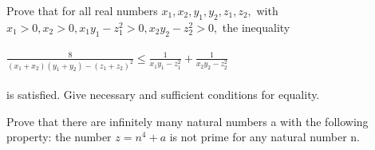 

\item Prove that for all real numbers $x_1, x_2, y_1, y_2, z_1, z_2,$ with $x_1 > 0, x_2 > 0, x_1y_1-z_{1}^{2}> 0, x_2y_2 - z_{2}^{2} > 0,$ the inequality\\
\\$\frac{8}{(x_1 + x_2)(y_1 + y_2) - (z_1 + z_2)^{2}} \leq \frac{1}{x_1y_1 - z_{1}^{2}} + \frac{1}{x_2y_2 - z_{2}^{2}}$\\
\\is satisfied. Give necessary and sufficient conditions for equality.\\

\item Prove that there are infinitely many natural numbers a with the following property: the number $z = n^{4} + a$ is not prime for any natural number n.

